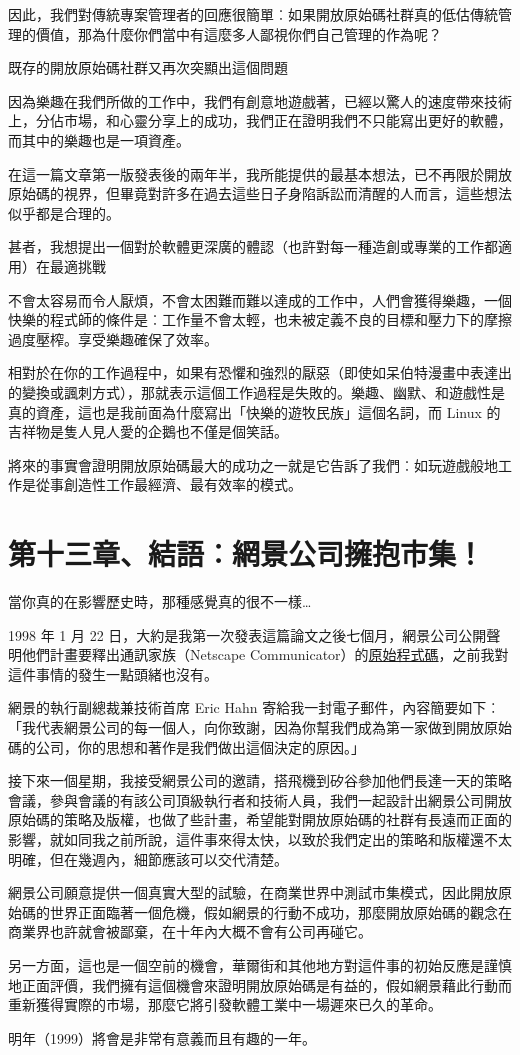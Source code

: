 \documentclass[10pt, b5paper]{book}
\makeatletter
\newcommand*{\shifttext}[2]{%
  \settowidth{\@tempdima}{#2}%
  \makebox[\@tempdima]{\hspace*{#1}#2}%
}
\makeatother
\begin{document}
因此，我們對傳統專案管理者的回應很簡單︰如果開放原始碼社群真的低估傳統管理的價值，那為什麼你們當中有這麼多人鄙視你們自己管理的作為呢？

既存的開放原始碼社群又再次突顯出這個問題 \shifttext{1pt}{---}\shifttext{-1pt}{---}
因為樂趣在我們所做的工作中，我們有創意地遊戲著，已經以驚人的速度帶來技術上，分佔市場，和心靈分享上的成功，我們正在證明我們不只能寫出更好的軟體，而其中的樂趣也是一項資產。

在這一篇文章第一版發表後的兩年半，我所能提供的最基本想法，已不再限於開放原始碼的視界，但畢竟對許多在過去這些日子身陷訴訟而清醒的人而言，這些想法似乎都是合理的。

甚者，我想提出一個對於軟體更深廣的體認（也許對每一種造創或專業的工作都適用）在最適挑戰
\shifttext{1pt}{---}\shifttext{-1pt}{---}
不會太容易而令人厭煩，不會太困難而難以達成的工作中，人們會獲得樂趣，一個快樂的程式師的條件是︰工作量不會太輕，也未被定義不良的目標和壓力下的摩擦過度壓榨。享受樂趣確保了效率。

相對於在你的工作過程中，如果有恐懼和強烈的厭惡（即使如呆伯特漫畫中表達出的變換或諷刺方式），那就表示這個工作過程是失敗的。樂趣、幽默、和遊戲性是真的資產，這也是我前面為什麼寫出「快樂的遊牧民族」這個名詞，而
Linux 的吉祥物是隻人見人愛的企鵝也不僅是個笑話。

將來的事實會證明開放原始碼最大的成功之一就是它告訴了我們︰如玩遊戲般地工作是從事創造性工作最經濟、最有效率的模式。

\newpage
\section{第十三章、結語︰網景公司擁抱市集！}

當你真的在影響歷史時，那種感覺真的很不一樣\ldots{}

1998 年 1 月 22
日，大約是我第一次發表這篇論文之後七個月，網景公司公開聲明他們計畫要釋出通訊家族（Netscape
Communicator）的\href{http://www.netscape.com/newsref/pr/newsrelease558.html}{原始程式碼}，之前我對這件事情的發生一點頭緒也沒有。

網景的執行副總裁兼技術首席 Eric Hahn
寄給我一封電子郵件，內容簡要如下︰「我代表網景公司的每一個人，向你致謝，因為你幫我們成為第一家做到開放原始碼的公司，你的思想和著作是我們做出這個決定的原因。」

接下來一個星期，我接受網景公司的邀請，搭飛機到矽谷參加他們長達一天的策略會議，參與會議的有該公司頂級執行者和技術人員，我們一起設計出網景公司開放原始碼的策略及版權，也做了些計畫，希望能對開放原始碼的社群有長遠而正面的影響，就如同我之前所說，這件事來得太快，以致於我們定出的策略和版權還不太明確，但在幾週內，細節應該可以交代清楚。

網景公司願意提供一個真實大型的試驗，在商業世界中測試市集模式，因此開放原始碼的世界正面臨著一個危機，假如網景的行動不成功，那麼開放原始碼的觀念在商業界也許就會被鄙棄，在十年內大概不會有公司再碰它。

另一方面，這也是一個空前的機會，華爾街和其他地方對這件事的初始反應是謹慎地正面評價，我們擁有這個機會來證明開放原始碼是有益的，假如網景藉此行動而重新獲得實際的市場，那麼它將引發軟體工業中一場遲來已久的革命。

明年（1999）將會是非常有意義而且有趣的一年。
\end{document}
